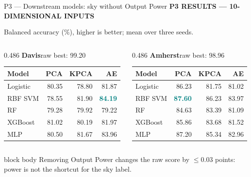 \documentclass[aspectratio=169,11pt]{beamer}
\newcommand{\sectiontag}[1]{{\footnotesize\usebeamercolor[fg]{structure}\textbf{#1}}\par\vspace{0.10cm}}
\newcommand{\smallmuted}[1]{{\footnotesize\color{slate}#1\par}}
\begin{document}
\begin{frame}{P3 — Downstream models: sky without Output Power}
\sectiontag{P3 \quad RESULTS — 10-DIMENSIONAL INPUTS}
\smallmuted{Balanced accuracy (\%), higher is better; mean over three seeds.}\vspace{0.18cm}
\begin{columns}[T,onlytextwidth]
\begin{column}{0.486\textwidth}
\textbf{Davis}\hfill{\scriptsize raw best: 99.20}\par\vspace{0.12cm}
{\fontsize{8.8}{10.4}\selectfont
\setlength{\tabcolsep}{3.9pt}
\renewcommand{\arraystretch}{1.39}
\begin{tabular}{@{}lrrr@{}}\toprule
\textbf{Model} & \textbf{PCA} & \textbf{KPCA} & \textbf{AE}\\\midrule
Logistic & 80.35 & 78.80 & 81.87\\
RBF SVM & 78.55 & 81.90 & \textcolor{teal}{\textbf{84.19}}\\
RF & 79.28 & 79.92 & 79.22\\
XGBoost & 81.02 & 80.19 & 81.97\\
MLP & 80.50 & 81.67 & 83.96\\
\bottomrule\end{tabular}}
\end{column}
\begin{column}{0.486\textwidth}
\textbf{Amherst}\hfill{\scriptsize raw best: 98.96}\par\vspace{0.12cm}
{\fontsize{8.8}{10.4}\selectfont
\setlength{\tabcolsep}{3.9pt}
\renewcommand{\arraystretch}{1.39}
\begin{tabular}{@{}lrrr@{}}\toprule
\textbf{Model} & \textbf{PCA} & \textbf{KPCA} & \textbf{AE}\\\midrule
Logistic & 86.23 & 81.75 & 81.02\\
RBF SVM & \textcolor{teal}{\textbf{87.60}} & 86.23 & 83.97\\
RF & 84.63 & 83.39 & 81.09\\
XGBoost & 85.86 & 83.68 & 81.52\\
MLP & 87.20 & 85.34 & 82.96\\
\bottomrule\end{tabular}}
\end{column}
\end{columns}
\vspace{0.30cm}
\begin{beamercolorbox}[wd=\linewidth,sep=0.14cm]{block body}
\footnotesize Removing Output Power changes the raw score by $\le$0.03 points: power is not the shortcut for the sky label.
\end{beamercolorbox}
\end{frame}
\end{document}
